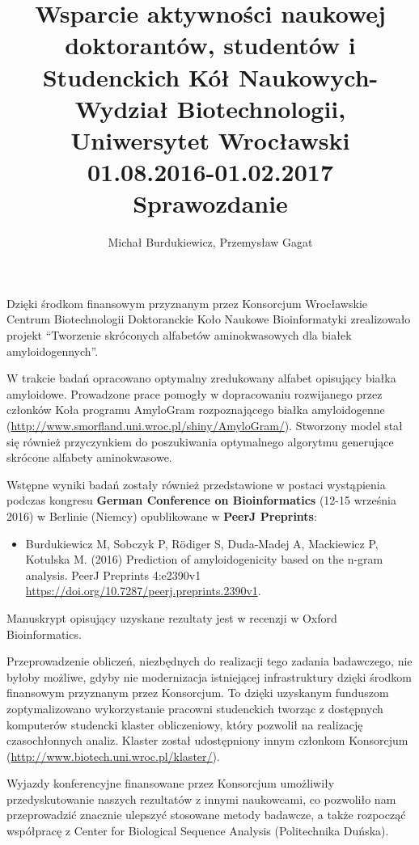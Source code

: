 \documentclass[12pt]{article}
\author{Michał Burdukiewicz, Przemysław Gagat}
\title{\large Wsparcie aktywności naukowej doktorantów, studentów i Studenckich 
  Kół Naukowych- Wydział Biotechnologii, Uniwersytet Wrocławski 
  \\ 
  01.08.2016-01.02.2017 \\ 
  \normalsize Sprawozdanie}
\date{}
\begin{document}
\maketitle

Dzięki środkom finansowym przyznanym przez Konsorcjum Wrocławskie Centrum 
Biotechnologii Doktoranckie Koło Naukowe Bioinformatyki  
zrealizowało projekt ``Tworzenie skróconych alfabetów aminokwasowych dla białek amyloidogennych''.

W trakcie badań opracowano optymalny zredukowany alfabet opisujący białka amyloidowe. 
Prowadzone prace pomogły w dopracowaniu rozwijanego przez członków Koła programu AmyloGram 
rozpoznającego białka amyloidogenne (\url{http://www.smorfland.uni.wroc.pl/shiny/AmyloGram/}).
Stworzony model stał się również przyczynkiem do poszukiwania optymalnego algorytmu generujące 
skrócone alfabety aminokwasowe.

Wstępne wyniki badań zostały również przedstawione w postaci wystąpienia podczas 
kongresu \textbf{German Conference on Bioinformatics} (12-15 września 2016) w 
Berlinie (Niemcy) opublikowane w \textbf{PeerJ Preprints}:
\begin{itemize}
\item Burdukiewicz M, Sobczyk P, Rödiger S, Duda-Madej A, Mackiewicz P, Kotulska M. (2016) Prediction of amyloidogenicity based on the n-gram analysis. PeerJ Preprints 4:e2390v1 \url{https://doi.org/10.7287/peerj.preprints.2390v1}.
\end{itemize}

Manuskrypt opisujący uzyskane rezultaty jest w recenzji w Oxford Bioinformatics.

Przeprowadzenie 
obliczeń, niezbędnych do realizacji tego zadania badawczego, nie byłoby 
możliwe, gdyby nie modernizacja istniejącej infrastruktury dzięki środkom 
finansowym przyznanym przez Konsorcjum. To dzięki uzyskanym funduszom zoptymalizowano wykorzystanie pracowni studenckich tworząc z dostępnych komputerów studencki klaster 
obliczeniowy, który pozwolił na realizację czasochłonnych analiz. Klaster 
został udostępniony innym członkom Konsorcjum (\url{http://www.biotech.uni.wroc.pl/klaster/}). 

Wyjazdy konferencyjne finansowane przez Konsorcjum umożliwiły przedyskutowanie naszych 
rezultatów z innymi naukowcami, co pozwoliło nam przeprowadzić znacznie ulepszyć stosowane metody 
badawcze, a także rozpocząć współpracę z Center for Biological Sequence Analysis (Politechnika Duńska).
\end{document}
